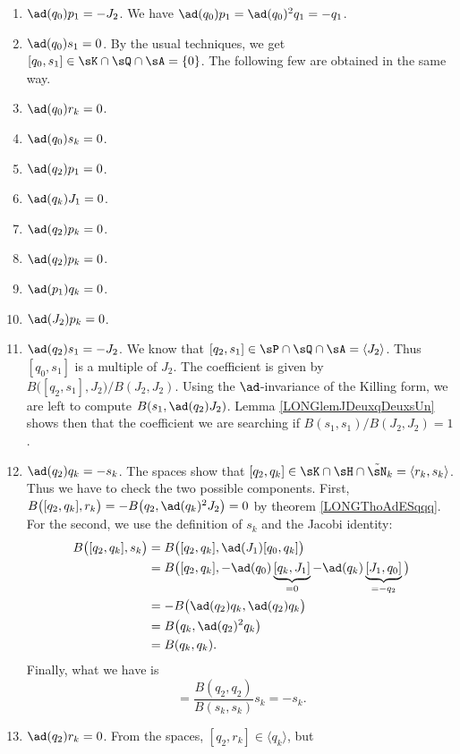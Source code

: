 \begin{enumerate}
	\item$\ad(q_0)p_1=-J_2$\label{LONGItemComqzpun}. We have $\ad(q_0)p_1=\ad(q_0)^2q_1=-q_1$.
	\item$\ad(q_0)s_1=0$. By the usual techniques, we get $[q_0,s_1]\in\sK\cap\sQ\cap\sA=\{ 0 \}$. The following few are obtained in the same way.
	\item$\ad(q_0)r_k=0$\label{LONGItemComqzrk}.
	\item$\ad(q_0)s_k=0$.
	\item$\ad(q_2)p_1=0$.
	\item$\ad(q_k)J_1=0$.
	\item$\ad(q_2)p_k=0$.
	\item$\ad(q_2)p_k=0$.
	\item$\ad(p_1)q_k=0$\label{LONGItemCompunqk}.
	\item$\ad(J_2)p_k=0$.
	\item$\ad(q_2)s_1=-J_2$. We know that $[q_2,s_1]\in\sP\cap\sQ\cap\sA=\langle J_2\rangle$. Thus $[q_0,s_1]$ is a multiple of $J_2$. The coefficient is given by$B\big( [q_2,s_1],J_2 \big)/B(J_2,J_2)$. Using the $\ad$-invariance of the Killing form, we are left to compute $B(s_1,\ad(q_2)J_2)$. Lemma \ref{LONGlemJDeuxqDeuxsUn} shows then that the coefficient we are searching if $B(s_1,s_1)/B(J_2,J_2)=1$.
	\item\label{LONGItemComqdeuxqk}$\ad(q_2)q_k=-s_k$. The spaces show that $[q_2,q_k]\in\sK\cap\sH\cap\tilde\sN_k=\langle r_k,s_k\rangle$. Thus we have to check the two possible components. First, $B\big( [q_2,q_k],r_k \big)=-B\big( q_2,\ad(q_k)^2J_2 \big)=0$ by theorem \ref{LONGThoAdESqqq}. For the second, we use the definition of $s_k$ and the Jacobi identity:
		\begin{equation}
			\begin{aligned}[]
				B\big( [q_2,q_k],s_k \big)&=B\big( [q_2,q_k],\ad(J_1)[q_0,q_k] \big)\\
				&=B\big( [q_2,q_k],-\ad(q_0)\underbrace{[q_k,J_1]}_{=0}-\ad(q_k)\underbrace{[J_1,q_0]}_{=-q_2} \big)\\
				&=-B\big( \ad(q_2)q_k,\ad(q_2)q_k \big)\\
				&=B\big( q_k,\ad(q_2)^2q_k \big)\\
				&=B(q_k,q_k).
			\end{aligned}
		\end{equation}
		Finally, what we have is
		\begin{equation}
			[q_2,q_k]=\frac{ B(q_2,q_2) }{ B(s_k,s_k) }s_k=-s_k.
		\end{equation}
	\item$\ad(q_2)r_k=0$. From the spaces, $[q_2,r_k]\in\langle q_k\rangle$, but

\end{enumerate}
